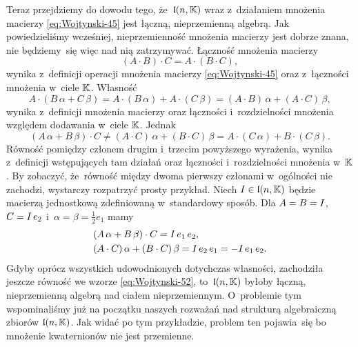\documentclass[a4paper,11pt]{article}
\numberwithin{equation}{section}
\begin{document}
Teraz przejdziemy do dowodu tego, że~$\mathfrak{l}( n, \mathbb{K} )$ wraz z~działaniem
mnożenia macierzy \eqref{eq:Wojtynski-45} jest łączną, nieprzemienną
algebrą. Jak powiedzieliśmy wcześniej, nieprzemienność mnożenia macierzy
jest dobrze znana, nie będziemy~się więc nad nią zatrzymywać. Łączność
mnożenia macierzy
\begin{equation}
  \label{eq:Wojtynski-50}
  ( A \cdot B ) \cdot C = A \cdot ( B \cdot C ),
\end{equation}
wynika z~definicji operacji mnożenia macierzy \eqref{eq:Wojtynski-45} oraz
z~łączności mnożenia w~ciele $\mathbb{K}$. Własność
\begin{equation}
  \label{eq:Wojtynski-51}
  A \cdot ( B \, \alpha + C \, \beta ) = A \cdot ( B \, \alpha ) + A \cdot ( C \, \beta ) =
  ( A \cdot B ) \, \alpha + ( A \cdot C ) \, \beta,
\end{equation}
wynika z~definicji mnożenia macierzy oraz łączności i~rozdzielności
mnożenia względem dodawania w~ciele $\mathbb{K}$. Jednak
\begin{equation}
  \label{eq:Wojtynski-52}
  ( A \, \alpha + B \, \beta ) \cdot C \neq
  ( A \cdot C ) \, \alpha + ( B \cdot C ) \, \beta =
  A \cdot ( C \, \alpha ) + B \cdot ( C \, \beta ).
\end{equation}
Równość pomiędzy członem drugim i~trzecim powyższego wyrażenia, wynika
z~definicji wstępujących tam działań oraz łączności i~rozdzielności
mnożenia w~$\mathbb{K}$. By zobaczyć, że~równość między dwoma pierwszy członami
w~ogólności nie zachodzi, wystarczy rozpatrzyć prosty przykład. Niech
$I \in \mathfrak{l}( n, \mathbb{K} )$ będzie macierzą jednostkową zdefiniowaną
w~standardowy sposób. Dla $A = B = I$, $C = I \, e_{ 2 }$
i~$\alpha = \beta = \frac{ 1 }{ 2 } e_{ 1 }$ mamy
\begin{subequations}
  \begin{align}
    \label{eq:Wojtynski-53-A}
    &( A \, \alpha + B \, \beta ) \cdot C = I \, e_{ 1 } \, e_{ 2 }, \\
    \label{eq:Wojtynski-53-B}
    &( A \cdot C ) \, \alpha + ( B \cdot C ) \, \beta = I \, e_{ 2 } \, e_{ 1 } =
      -I \, e_{ 1 } \, e_{ 2 }.
  \end{align}
\end{subequations}
Gdyby oprócz wszystkich udowodnionych dotychczas własności, zachodziła
jeszcze równość we wzorze \eqref{eq:Wojtynski-52}, to~$\mathfrak{l}( n, \mathbb{K} )$
byłoby łączną, nieprzemienną algebrą nad ciałem nieprzemiennym.
O~problemie tym wspominaliśmy już na początku naszych rozważań nad
strukturą algebraiczną zbiorów $\mathfrak{l}( n, \mathbb{K} )$. Jak widać po tym
przykładzie, problem ten pojawia~się bo mnożenie kwaternionów nie jest
przemienne.
\end{document}
